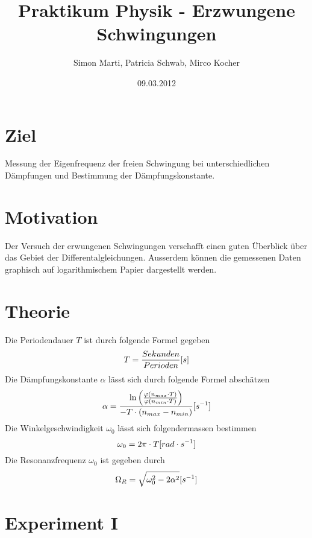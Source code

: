 \documentclass[12pt,a4paper]{article}
\title{Praktikum Physik - Erzwungene Schwingungen}
\author{Simon Marti, Patricia Schwab, Mirco Kocher}
\date{09.03.2012}
\begin{document}
\maketitle

\section*{Ziel}
Messung der Eigenfrequenz der freien Schwingung bei unterschiedlichen D\"ampfungen und Bestimmung der D\"ampfungskonstante.

\section*{Motivation}
Der Versuch der erwungenen Schwingungen verschafft einen guten \"Uberblick \"uber das Gebiet der Differentalgleichungen. Ausserdem k\"onnen die gemessenen Daten graphisch auf logarithmischem Papier dargestellt werden. 

\section*{Theorie}
Die Periodendauer $T$ ist durch folgende Formel gegeben
\begin{equation}
T = \frac{Sekunden}{Perioden} \mbox [{s}]
\end{equation}
Die D\"ampfungskonstante $\alpha$ l\"asst sich durch folgende Formel absch\"atzen
\begin{equation}
\alpha = \frac{\ln\left( \frac{\varphi(n_{max} \cdot T)}{\varphi(n_{min} \cdot T)}\right)}{-T\cdot (n_{max} - n_{min})} \mbox [{s}^{-1}]
\end{equation}
Die Winkelgeschwindigkeit $\omega_0$ l\"asst sich folgendermassen bestimmen
\begin{equation}
\omega_0 = 2\pi \cdot T \mbox[{rad \cdot s}^{-1}]
\end{equation}
Die Resonanzfrequenz $\omega_0$ ist gegeben durch
\begin{equation}
\Omega_R = \sqrt{\omega_0^2 - 2\alpha^2} \mbox [{s}^{-1}]
\end{equation}

\newpage

\section*{Experiment I}

\end{document}
